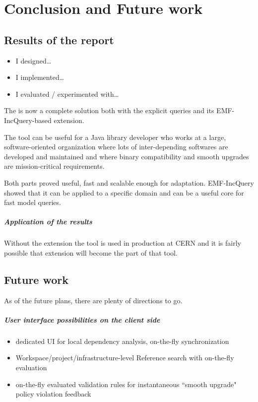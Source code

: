\chapter{Conclusion and Future work}



\section{Results of the report}


\begin{itemize}
  \item I designed\ldots
  \item I implemented\ldots
  \item I evaluated / experimented with\ldots
\end{itemize}

The \ptool{} is now a complete solution both with the explicit queries and its
EMF-IncQuery-based extension. 

The tool can be useful for a Java library developer who works at a large,
software-oriented organization where lots of inter-depending softwares are
developed and maintained and where binary compatibility and smooth upgrades are
mission-critical requirements.

Both parts proved useful, fast and scalable enough for adaptation. EMF-IncQuery 
showed that it can be applied to a specific domain and can be a useful core
for fast model queries. 


\paragraph*{Application of the results}
Without the extension the tool is used in
production at CERN and it is fairly possible that extension will become the part
of that tool.

\section{Future work}
As of the future plans, there are plenty of directions to go.

\paragraph*{User interface possibilities on the client side}
\begin{itemize}
  \item dedicated UI for local dependency analysis, on-the-fly synchronization
  \item Workspace/project/infrastructure-level Reference search with on-the-fly evaluation
  \item on-the-fly evaluated validation rules for instantaneous ``smooth upgrade" policy violation feedback
\end{itemize}

